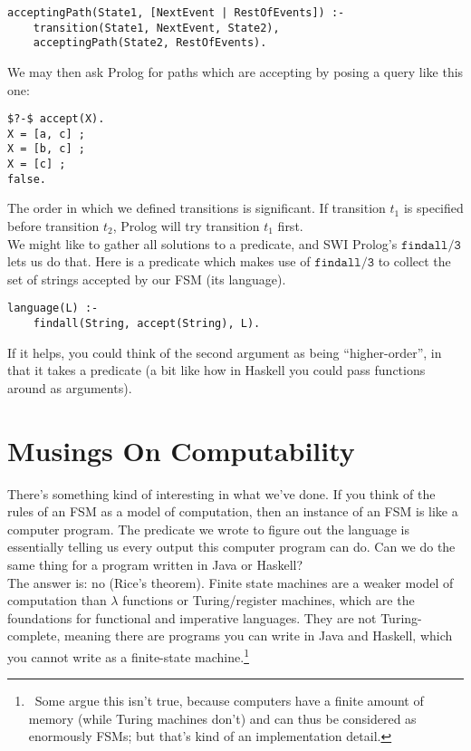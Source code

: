 \documentclass[a4paper,12pt]{article}
\newcommand{\kwa}[1]{\mathtt{#1}}
\begin{document}
\begin{lstlisting}
acceptingPath(State1, [NextEvent | RestOfEvents]) :-
    transition(State1, NextEvent, State2),
    acceptingPath(State2, RestOfEvents).
\end{lstlisting}

\noindent
We may then ask Prolog for paths which are accepting by posing a query like this one:

\begin{lstlisting}
$?-$ accept(X).
X = [a, c] ;
X = [b, c] ;
X = [c] ;
false.
\end{lstlisting}

\noindent
The order in which we defined transitions is significant. If transition $t_1$ is specified before transition $t_2$, Prolog will try transition $t_1$ first.\\

\noindent
We might like to gather all solutions to a predicate, and SWI Prolog's $\kwa{findall \slash 3}$ lets us do that. Here is a predicate which makes use of $\kwa{findall \slash 3}$ to collect the set of strings accepted by our FSM (its language).

\begin{lstlisting}
language(L) :-
    findall(String, accept(String), L).
\end{lstlisting}

\noindent
If it helps, you could think of the second argument as being ``higher-order'', in that it takes a predicate (a bit like how in Haskell you could pass functions around as arguments). \\


\section{Musings On Computability}

\noindent
There's something kind of interesting in what we've done. If you think of the rules of an FSM as a model of computation, then an instance of an FSM is like a computer program. The predicate we wrote to figure out the language is essentially telling us every output this computer program can do. Can we do the same thing for a program written in Java or Haskell? \\

\noindent
The answer is: no (Rice's theorem). Finite state machines are a weaker model of computation than $\lambda$ functions or Turing/register machines, which are the foundations for functional and imperative languages. They are not Turing-complete, meaning there are programs you can write in Java and Haskell, which you cannot write as a finite-state machine.\footnote{~Some argue this isn't true, because computers have a finite amount of memory (while Turing machines don't) and can thus be considered as enormously FSMs; but that's kind of an implementation detail.} \\
\end{document}
